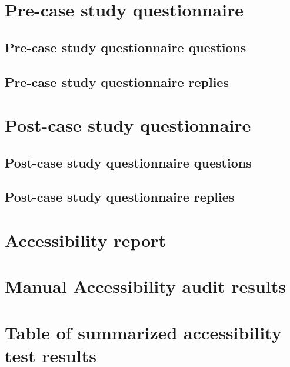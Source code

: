\documentclass{master_thesis}
\begin{document}
\appendix
\section{Pre-case study questionnaire }\label{appendix:pre-survey}
\subsection{Pre-case study questionnaire questions}\label{appendix:pre-survey-questions}
\subsection{Pre-case study questionnaire replies}\label{appendix:pre-survey-replies}
\section{Post-case study questionnaire }\label{appendix:post-survey}
\subsection{Post-case study questionnaire questions}\label{appendix:post-survey-questions}
\subsection{Post-case study questionnaire replies}\label{appendix:post-survey-replies}
\section{Accessibility report}\label{appendix:report}


\section{Manual Accessibility audit results}\label{appendix:manual-audit}

\section{Table of summarized accessibility test results}\label{appendix:results-table}
\end{document}
